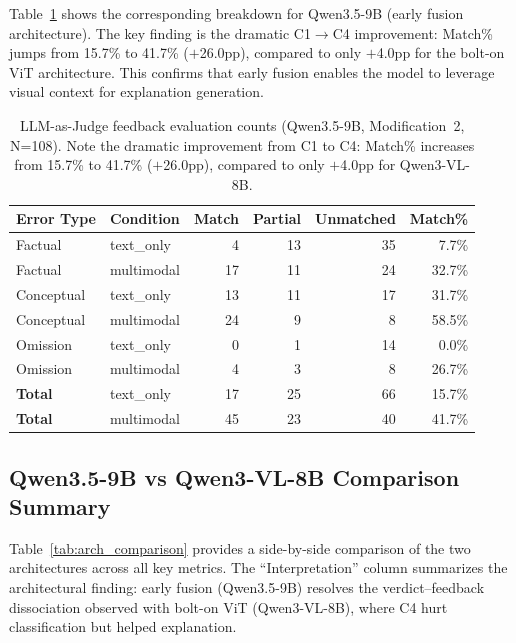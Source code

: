 \documentclass{article}
\begin{document}
Table~\ref{tab:9b_feedback} shows the corresponding breakdown for Qwen3.5-9B
(early fusion architecture). The key finding is the dramatic C1$\rightarrow$C4
improvement: Match\% jumps from 15.7\% to 41.7\% ($+$26.0pp), compared to only
$+$4.0pp for the bolt-on ViT architecture. This confirms that early fusion
enables the model to leverage visual context for explanation generation.

\begin{table}[h]
\centering
\small
\begin{tabular}{@{}llrrrr@{}}
\toprule
Error Type & Condition & Match & Partial & Unmatched & Match\% \\
\midrule
Factual    & text\_only    &  4 & 13 & 35 &  7.7\% \\
Factual    & multimodal    & 17 & 11 & 24 & 32.7\% \\
Conceptual & text\_only    & 13 & 11 & 17 & 31.7\% \\
Conceptual & multimodal    & 24 &  9 &  8 & 58.5\% \\
Omission   & text\_only    &  0 &  1 & 14 &  0.0\% \\
Omission   & multimodal    &  4 &  3 &  8 & 26.7\% \\
\midrule
\textbf{Total} & text\_only    & 17 & 25 & 66 & 15.7\% \\
\textbf{Total} & multimodal    & 45 & 23 & 40 & 41.7\% \\
\bottomrule
\end{tabular}
\caption{LLM-as-Judge feedback evaluation counts (Qwen3.5-9B, Modification~2, N=108).
Note the dramatic improvement from C1 to C4: Match\% increases from 15.7\% to 41.7\%
($+$26.0pp), compared to only $+$4.0pp for Qwen3-VL-8B.}
\label{tab:9b_feedback}
\end{table}

\subsection{Qwen3.5-9B vs Qwen3-VL-8B Comparison Summary}
\label{app:comparison}

Table~\ref{tab:arch_comparison} provides a side-by-side comparison of the two
architectures across all key metrics. The ``Interpretation'' column summarizes
the architectural finding: early fusion (Qwen3.5-9B) resolves the verdict--feedback
dissociation observed with bolt-on ViT (Qwen3-VL-8B), where C4 hurt classification
but helped explanation.
\end{document}
